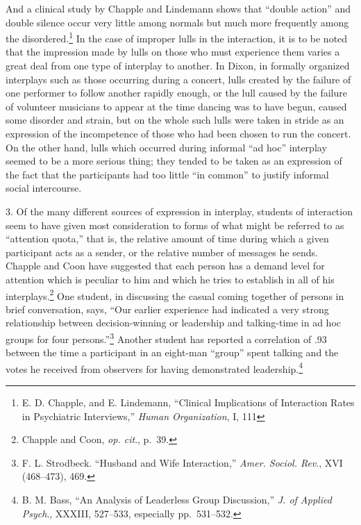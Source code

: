 \documentclass[openany,nobib]{tufte-book}
\begin{document}
\noindent And a clinical study by Chapple and Lindemann shows that ``double
action'' and double silence occur very little among normals but much
more frequently among the disordered.\footnote{E. D. Chapple, and E.
  Lindemann, ``Clinical Implications of Interaction Rates in Psychiatric
  Interviews,'' \emph{Human Organization}, I, 111} In the case of
improper lulls in the interaction, it is to be noted that the impression
made by lulls on those who must experience them varies a great deal from
one type of interplay to another. In Dixon, in formally organized
interplays such as those occurring during a concert, lulls created by
the failure of one performer to follow another rapidly enough, or the
lull caused by the failure of volunteer musicians to appear at the time
dancing was to have begun, caused some disorder and strain, but on the
whole such lulls were taken in stride as an expression of the
incompetence of those who had been chosen to run the concert. On the
other hand, lulls which occurred during informal ``ad hoc'' interplay
seemed to be a more serious thing; they tended to be taken as an
expression of the fact that the participants had too little ``in
common'' to justify informal social intercourse.

3. Of the many different sources of expression in
interplay, students of interaction seem to have given most consideration
to forms of what might be referred to as ``attention quota,'' that is,
the relative amount of time during which a given participant acts as a
sender, or the relative number of messages he sends. Chapple and Coon
have suggested that each person has a demand level for attention which
is peculiar to him and which he tries to establish in all of his
interplays.\footnote{Chapple and Coon, \emph{op. cit}., p.~39.} One
student, in discussing the casual coming together of persons in brief
conversation, says, ``Our earlier experience had indicated a very strong
relationship between decision-winning or leadership and talking-time in
ad hoc groups for four persons.''\footnote{F. L. Strodbeck. ``Husband
  and Wife Interaction,'' \emph{Amer. Sociol. Rev}., XVI (468--473),
  469.} Another student has reported a correlation of .93 between the
time a participant in an eight-man ``group'' spent talking and the votes
he received from observers for having demonstrated
leadership.\footnote{B. M. Bass, ``An Analysis of Leaderless Group
  Discussion,'' \emph{J. of Applied Psych}., XXXIII, 527--533,
  especially pp.~531--532.}
\end{document}
